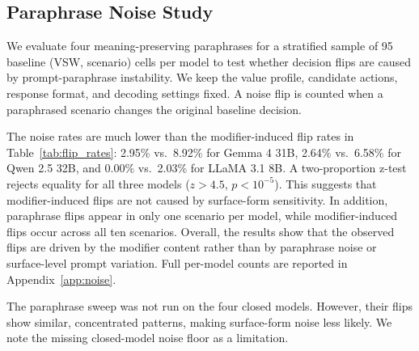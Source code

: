 \documentclass[11pt]{article}
\begin{document}


\subsection{Paraphrase Noise Study}
\label{sec:noise}

We evaluate four meaning-preserving paraphrases for a stratified sample of 95 baseline (VSW, scenario) cells per model to test whether decision flips are caused by prompt-paraphrase instability. We keep the value profile, candidate actions, response format, and decoding settings fixed. A noise flip is counted when a paraphrased scenario changes the original baseline decision.

The noise rates are much lower than the modifier-induced flip rates in Table~\ref{tab:flip_rates}: 2.95\% vs.\ 8.92\% for Gemma 4 31B, 2.64\% vs.\ 6.58\% for Qwen 2.5 32B, and 0.00\% vs.\ 2.03\% for LLaMA 3.1 8B. A two-proportion z-test rejects equality for all three models ($z > 4.5$, $p < 10^{-5}$). This suggests that modifier-induced flips are not caused by surface-form sensitivity. In addition, paraphrase flips appear in only one scenario per model, while modifier-induced flips occur across all ten scenarios.
Overall, the results show that the observed flips are driven by the modifier content rather than by paraphrase noise or surface-level prompt variation. Full per-model counts are reported in Appendix~\ref{app:noise}.

The paraphrase sweep was not run on the four closed models.
However, their flips show similar, concentrated patterns, making surface-form noise less likely.
We note the missing closed-model noise floor as a limitation.
\end{document}
